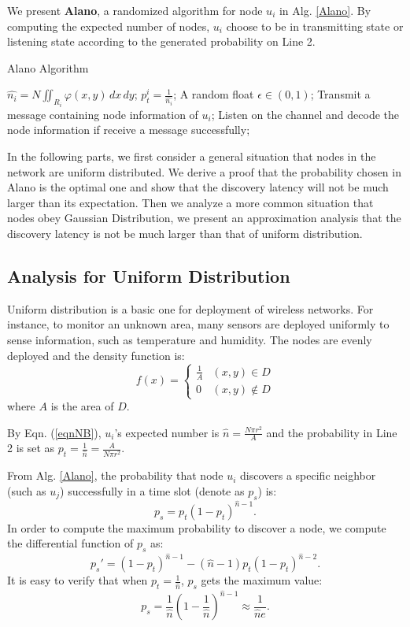 We present \textbf{Alano}, a randomized algorithm for node $u_i$ in Alg. \ref{Alano}.
By computing the expected number of nodes, $u_i$ choose to be in transmitting state or listening state according to the generated probability on Line 2.


\begin{algorithm}
\caption{Alano Algorithm}
\label{Alano}
\begin{algorithmic}[1]
\STATE $\hat{n_i} = N\iint_{R_i} \varphi(x,y)\,dx\,dy$;
\STATE $p_t^i = \frac{1}{\hat{n_i}}$;
	\STATE A random float $\epsilon \in (0,1)$;
    		\STATE Transmit a message containing node information of $u_i$;
	\ELSE
    		\STATE Listen on the channel and decode the node information if receive a message successfully;
	\ENDIF
\ENDWHILE
\end{algorithmic}
\end{algorithm}

In the following parts, we first consider a general situation that nodes in the network are uniform distributed. We derive a proof that the probability chosen in Alano is the optimal one and show that the discovery latency will not be much larger than its expectation. Then we analyze a more common situation that nodes obey Gaussian Distribution, we present an
approximation analysis that the discovery latency is not be much larger than that of uniform distribution.


\subsection{Analysis for Uniform Distribution}
\label{uniform}
Uniform distribution is a basic one for deployment of wireless networks.
For instance, to monitor an unknown area, many sensors are deployed uniformly to sense information, such as temperature and humidity\cite{XX}. The nodes are evenly deployed and the density function is:
$$f(x)=
\begin{cases}
\frac{1}{A}& (x,y)\in D\\
0& (x,y)\notin D
\end{cases}$$
where $A$ is the area of $D$.

By Eqn. (\ref{eqnNB}), $u_i$'s expected number is $\hat{n} = \frac{N\pi r^2}{A}$ and the probability in Line 2 is set as $p_t = \frac{1}{\hat{n}}=\frac{A}{N\pi r^2}$.

From Alg. \ref{Alano}, the probability that node $u_i$ discovers a specific neighbor (such as $u_j$) successfully in a time slot (denote as $p_s$) is:
$$
p_s = p_t{(1-p_t)}^{\hat{n}-1}.
$$
In order to compute the maximum probability to discover a node, we compute the differential function of $p_s$ as:
$$
p_s' = {(1-p_t)}^{\hat{n}-1}-(\hat{n}-1)p_t{(1-p_t)}^{\hat{n}-2}.
$$
It is easy to verify that when $p_t=\frac{1}{\hat{n}}$, $p_s$ gets the maximum value:
$$p_s = \frac{1}{\hat{n}}{(1-\frac{1}{\hat{n}})}^{\hat{n}-1} \approx \frac{1}{\hat{n}e}.$$

